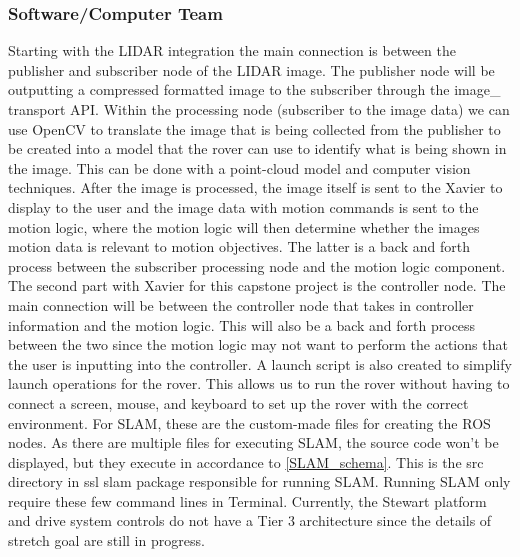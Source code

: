\documentclass[a4paper, 10pt]{article}
\begin{document}
		\subsubsection*{Software/Computer Team}
	Starting with the LIDAR integration the main connection is between the publisher and subscriber node of the LIDAR image. The publisher node will be outputting a compressed formatted image to the subscriber through the image\_ transport API. Within the processing node (subscriber to the image data) we can use OpenCV to translate the image that is being collected from the publisher to be created into a model that the rover can use to identify what is being shown in the image. This can be done with a point-cloud model and computer vision techniques. After the image is processed, the image itself is sent to the Xavier to display to the user and the image data with motion commands is sent to the motion logic, where the motion logic will then determine whether the images motion data is relevant to motion objectives. The latter is a back and forth process between the subscriber processing node and the motion logic component. 
The second part with Xavier for this capstone project is the controller node. The main connection will be between the controller node that takes in controller information and the motion logic. This will also be a back and forth process between the two since the motion logic may not want to perform the actions that the user is inputting into the controller. A launch script is also created to simplify launch operations for the rover. This allows us to run the rover without having to connect a screen, mouse, and keyboard to set up the rover with the correct environment.
	For SLAM, these are the custom-made files for creating the ROS nodes. As there are multiple files for executing SLAM, the source code won't be displayed, but they execute in accordance to \ref{SLAM_schema}. This is the src directory in ssl slam package responsible for running SLAM. Running SLAM only require these few command lines in Terminal.
	Currently, the Stewart platform and drive system controls do not have a Tier 3 architecture since the details of stretch goal are still in progress.
	 
\end{document}

